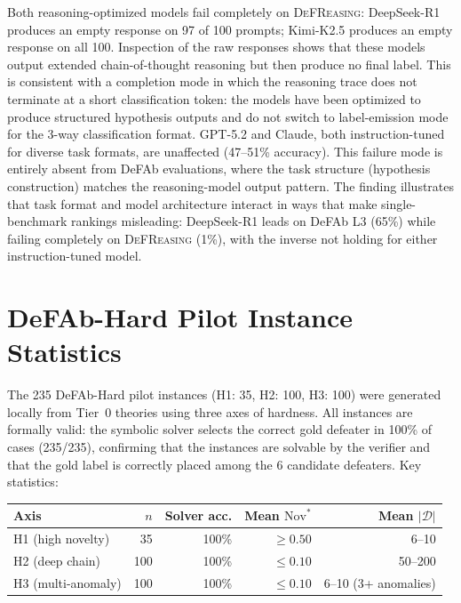 \documentclass{article}
\theoremstyle{definition}
\newcommand{\D}{\mathcal{D}}
\newcommand{\Nov}{\mathrm{Nov}}
\begin{document}
Both reasoning-optimized models fail completely on \textsc{DeFReasing}: DeepSeek-R1 produces an empty response on 97 of 100 prompts; Kimi-K2.5 produces an empty response on all 100. Inspection of the raw responses shows that these models output extended chain-of-thought reasoning but then produce no final label. This is consistent with a completion mode in which the reasoning trace does not terminate at a short classification token: the models have been optimized to produce structured hypothesis outputs and do not switch to label-emission mode for the 3-way classification format. GPT-5.2 and Claude, both instruction-tuned for diverse task formats, are unaffected (47--51\% accuracy). This failure mode is entirely absent from DeFAb evaluations, where the task structure (hypothesis construction) matches the reasoning-model output pattern. The finding illustrates that task format and model architecture interact in ways that make single-benchmark rankings misleading: DeepSeek-R1 leads on DeFAb L3 (65\%) while failing completely on \textsc{DeFReasing} (1\%), with the inverse not holding for either instruction-tuned model.

\section{DeFAb-Hard Pilot Instance Statistics}\label{app:defabhard}

The 235 DeFAb-Hard pilot instances (H1: 35, H2: 100, H3: 100) were generated locally from Tier~0 theories using three axes of hardness. All instances are formally valid: the symbolic solver selects the correct gold defeater in 100\% of cases (235/235), confirming that the instances are solvable by the verifier and that the gold label is correctly placed among the 6 candidate defeaters. Key statistics:

\begin{table}[h]
\centering
\small
\begin{tabular}{lrrrr}
\toprule
Axis & $n$ & Solver acc. & Mean $\Nov^*$ & Mean $|\D|$ \\
\midrule
H1 (high novelty)    & \phantom{0}35 & 100\% & $\geq 0.50$ & 6--10 \\
H2 (deep chain)      & 100 & 100\% & $\leq 0.10$ & 50--200 \\
H3 (multi-anomaly)   & 100 & 100\% & $\leq 0.10$ & 6--10 (3+ anomalies) \\
\bottomrule
\end{tabular}
\end{table}
\end{document}
